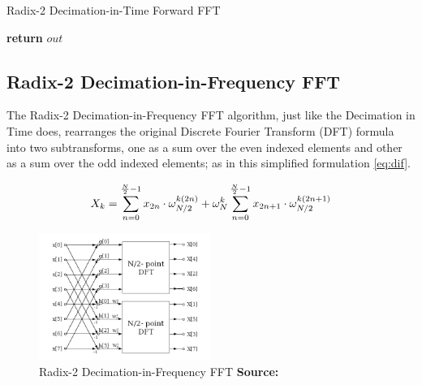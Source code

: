 \documentclass[
  oneside,
  11pt, a4paper,
  footinclude=true,
  headinclude=true,
  cleardoublepage=empty
]{scrbook}
\newcommand*{\source}[1]{%
    \textbf{Source:} \cite{#1}%
}
\begin{document}
\begin{algorithm}
    \caption{Radix-2 Decimation-in-Time Forward FFT} \label{alg:dit}


    \textbf{return} $out$\;
\end{algorithm}

\subsection{Radix-2 Decimation-in-Frequency FFT} \label{subsec:radix-2-decimation-in-frequency-fft}

The Radix-2 Decimation-in-Frequency FFT algorithm, just like the Decimation in Time does, rearranges the original Discrete Fourier Transform (DFT) formula into two subtransforms, one as a sum over the even indexed elements and other as a sum over the odd indexed elements; as in this simplified formulation \autoref{eq:dif}.

\begin{equation} \label{eq:dif}
    X_{k} = \sum_{n=0}^{\frac{N}{2}-1}x_{2n} \cdot \omega_{N/2}^{k(2n)} + \omega_{N}^{k} \sum_{n=0}^{\frac{N}{2}-1}x_{2n+1} \cdot \omega_{N/2}^{k(2n+1)} \\
\end{equation}

\begin{figure}[h] 
    \centering
    \includegraphics[width=0.5\textwidth]{imgs/dif_fft.png}
    \caption{Radix-2 Decimation-in-Frequency FFT \source{jones2014digital}}
    \label{fig:dif-fft}
\end{figure}
\end{document}
